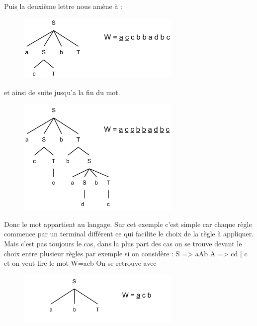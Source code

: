 \documentclass{article}
\begin{document}
Puis la deuxième lettre nous amène à :

\begin{figure}[h]
	\centering
		\includegraphics[width=0.70\textwidth]{AnalyseDescendante2.png}
	\label{fig:AnalyseDescendante2}
\end{figure}\FloatBarrier

et ainsi de suite jusqu'a la fin du mot.

\begin{figure}[h]
	\centering
		\includegraphics[width=0.70\textwidth]{AnalyseDescendante3.png}
	\label{fig:AnalyseDescendante3}
\end{figure}\FloatBarrier

Donc le mot appartient au langage. Sur cet exemple c'est simple car chaque règle commence par un terminal différent ce qui facilite le choix de la règle à appliquer. Mais c'est pas toujours le cas, dans la plus part des cas on se trouve devant le choix entre plusieur règles par exemple si on considère :\newline
S => aAb\newline
A => cd | c \newline
et on veut lire le mot W=acb\newline
On se retrouve avec

\begin{figure}[h]
	\centering
		\includegraphics[width=0.70\textwidth]{AnalyseDescendante4.png}
	\label{fig:AnalyseDescendante4}
\end{figure}\FloatBarrier
\end{document}
